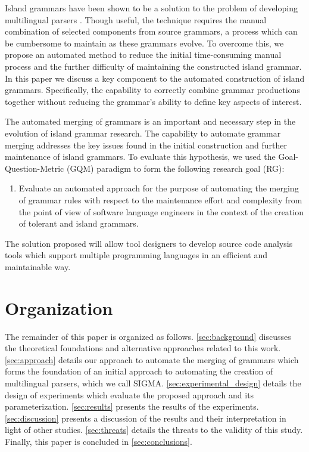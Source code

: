 \documentclass[10pt,nocc]{xrese_report}
\begin{document}
Island grammars have been shown to be a solution to the problem of developing multilingual parsers \cite{synytskyy_robust_2003}. Though useful, the technique requires the manual combination of selected components from source grammars, a process which can be cumbersome to maintain as these grammars evolve. To overcome this, we propose an automated method to reduce the initial time-consuming manual process and the further difficulty of maintaining the constructed island grammar. In this paper we discuss a key component to the automated construction of island grammars. Specifically, the capability to correctly combine grammar productions together without reducing the grammar's ability to define key aspects of interest.

The automated merging of grammars is an important and necessary step in the evolution of island grammar research. The capability to automate grammar merging addresses the key issues found in the initial construction and further maintenance of island grammars. To evaluate this hypothesis, we used the Goal-Question-Metric (GQM) paradigm \cite{caldiera_goal_1994} to form the following research goal (RG):

\begin{enumerate}[label={\textbf{RG}},left=.2in]
  \item Evaluate an automated approach for the purpose of automating the merging of grammar rules with respect to the maintenance effort and complexity from the point of view of software language engineers in the context of the creation of tolerant and island grammars.
\end{enumerate}

\noindent The solution proposed will allow tool designers to develop source code analysis tools which support multiple programming languages in an efficient and maintainable way.

\section{Organization}

The remainder of this paper is organized as follows. \ref{sec:background} discusses the theoretical foundations and alternative approaches related to this work. \ref{sec:approach} details our approach to automate the merging of grammars which forms the foundation of an initial approach to automating the creation of multilingual parsers, which we call SIGMA. \ref{sec:experimental_design} details the design of experiments which evaluate the proposed approach and its parameterization. \ref{sec:results} presents the results of the experiments. \ref{sec:discussion} presents a discussion of the results and their interpretation in light of other studies. \ref{sec:threats} details the threats to the validity of this study. Finally, this paper is concluded in \ref{sec:conclusions}.
\end{document}
